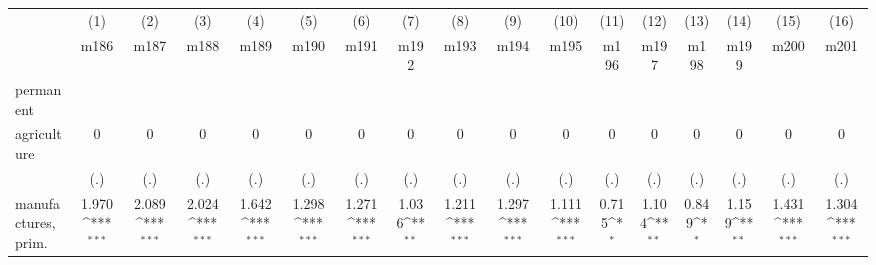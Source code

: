 {
\def\sym#1{\ifmmode^{#1}\else\(^{#1}\)\fi}
\begin{tabular}{l*{16}{c}}
\hline\hline
                    &\multicolumn{1}{c}{(1)}&\multicolumn{1}{c}{(2)}&\multicolumn{1}{c}{(3)}&\multicolumn{1}{c}{(4)}&\multicolumn{1}{c}{(5)}&\multicolumn{1}{c}{(6)}&\multicolumn{1}{c}{(7)}&\multicolumn{1}{c}{(8)}&\multicolumn{1}{c}{(9)}&\multicolumn{1}{c}{(10)}&\multicolumn{1}{c}{(11)}&\multicolumn{1}{c}{(12)}&\multicolumn{1}{c}{(13)}&\multicolumn{1}{c}{(14)}&\multicolumn{1}{c}{(15)}&\multicolumn{1}{c}{(16)}\\
                    &\multicolumn{1}{c}{m186}&\multicolumn{1}{c}{m187}&\multicolumn{1}{c}{m188}&\multicolumn{1}{c}{m189}&\multicolumn{1}{c}{m190}&\multicolumn{1}{c}{m191}&\multicolumn{1}{c}{m192}&\multicolumn{1}{c}{m193}&\multicolumn{1}{c}{m194}&\multicolumn{1}{c}{m195}&\multicolumn{1}{c}{m196}&\multicolumn{1}{c}{m197}&\multicolumn{1}{c}{m198}&\multicolumn{1}{c}{m199}&\multicolumn{1}{c}{m200}&\multicolumn{1}{c}{m201}\\
\hline
permanent           &                     &                     &                     &                     &                     &                     &                     &                     &                     &                     &                     &                     &                     &                     &                     &                     \\
agriculture         &           0         &           0         &           0         &           0         &           0         &           0         &           0         &           0         &           0         &           0         &           0         &           0         &           0         &           0         &           0         &           0         \\
                    &         (.)         &         (.)         &         (.)         &         (.)         &         (.)         &         (.)         &         (.)         &         (.)         &         (.)         &         (.)         &         (.)         &         (.)         &         (.)         &         (.)         &         (.)         &         (.)         \\
[1em]
manufactures, prim. &       1.970\sym{***}&       2.089\sym{***}&       2.024\sym{***}&       1.642\sym{***}&       1.298\sym{***}&       1.271\sym{***}&       1.036\sym{**} &       1.211\sym{***}&       1.297\sym{***}&       1.111\sym{***}&       0.715\sym{*}  &       1.104\sym{**} &       0.849\sym{*}  &       1.159\sym{**} &       1.431\sym{***}&       1.304\sym{***}\\

\end{tabular}}
